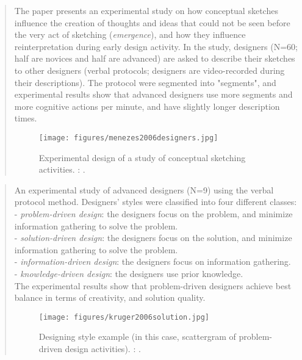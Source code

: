 		\begin{quote}
		\small
		The paper presents an experimental study on how conceptual sketches influence
		the creation of thoughts and ideas that could not be seen before the very act
		of sketching ({\em emergence}), and how they influence reinterpretation 
		during early design activity. In the study, designers (N=60; half are novices
		and half are advanced) are asked to describe
		their sketches to other designers (verbal protocols; designers are video-recorded
		during their descriptions). The protocol were segmented into "segments",
		and experimental results show that advanced designers use more segments
		and more cognitive actions per minute, and have slightly longer description
		times.
		\begin{figure}[htb]
		\begin{center}
		\texttt{[image: figures/menezes2006designers.jpg]}
		\caption{
		Experimental design of a study of conceptual sketching activities. 
		\citeauthor{menezes2006designers}: 
		\cite{menezes2006designers}.}
		\label{fig:menezes2006designers}
		\end{center}
		\end{figure}
		\end{quote}
		
		\begin{quote}
		\small
		An experimental study of advanced designers (N=9) using the verbal protocol method.
		Designers' styles were classified into four different classes:\\
		- {\em problem-driven design}: the designers focus on the problem, and 
		minimize information gathering to solve the problem.\\
		- {\em solution-driven design}: the designers focus on the solution, and 
		minimize information gathering to solve the problem.\\
		- {\em information-driven design}: the designers focus on information gathering.\\
		- {\em knowledge-driven design}: the designers use prior knowledge.\\
		The experimental results show that problem-driven designers achieve best 
		balance in terms of creativity, and solution quality.
		\begin{figure}[htb]
		\begin{center}
		\texttt{[image: figures/kruger2006solution.jpg]}
		\caption{
		Designing style example (in this case, scattergram of problem-driven design activities). 
		\citeauthor{kruger2006solution}: 
		\cite{kruger2006solution}.}
		\label{kruger2006solution}
		\end{center}
		\end{figure}
		\end{quote}

